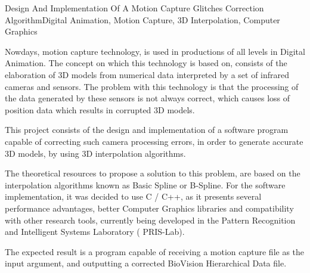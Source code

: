 
\begin{theabstract}{Design And Implementation Of A Motion Capture Glitches Correction Algorithm}{Digital Animation, Motion Capture, 3D Interpolation, Computer Graphics}

Nowdays, motion capture technology, is used in productions of all levels in Digital Animation. The concept on which this technology is based on, consists of the elaboration of 3D models from numerical data interpreted by a set of infrared cameras and sensors. The problem with this technology is that the processing of the data generated by these sensors is not always correct, which causes loss of position data which results in corrupted 3D models.

This project consists of the design and implementation of a software program capable of correcting such camera processing errors, in order to generate accurate 3D models, by using 3D interpolation algorithms.

The theoretical resources to propose a solution to this problem, are based on the interpolation algorithms known as Basic Spline or B-Spline. For the software implementation, it was decided to use C / C++, as it presents several performance advantages, better Computer Graphics libraries and compatibility with other research tools, currently being developed in the Pattern Recognition and Intelligent Systems Laboratory ( PRIS-Lab).

The expected result is a program capable of receiving a motion capture file as the input argument, and outputting a corrected BioVision Hierarchical Data file.


\end{theabstract}


